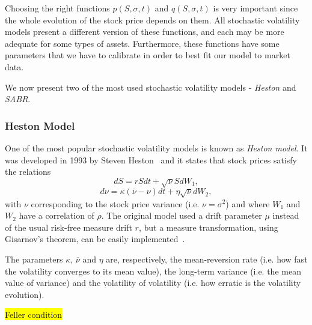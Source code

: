 Choosing the right functions $p(S,\sigma,t)$ and $q(S,\sigma,t)$ is very important since the whole evolution of the stock price depends on them. All stochastic volatility models present a different version of these functions, and each may be more adequate for some types of assets. Furthermore, these functions have some parameters that we have to calibrate in order to best fit our model to market data.

We now present two of the most used stochastic volatility models - \emph{Heston} and \emph{SABR}.



\subsubsection{Heston Model}
One of the most popular stochastic volatility models is known as \emph{Heston model}. It was developed in 1993 by Steven Heston~\cite{Heston} and it states that stock prices satisfy the relations
\begin{equation}
dS=rSdt+\sqrt{\nu}SdW_1,
\end{equation}
\begin{equation}
d\nu=\kappa(\overline{\nu}-\nu)dt+\eta\sqrt{\nu}dW_2,
\end{equation}
\noindent with $\nu$ corresponding to the stock price variance (i.e. $\nu=\sigma^2$) and where $W_1$ and $W_2$ have a correlation of $\rho$. The original model used a drift parameter $\mu$ instead of the usual risk-free measure drift $r$, but a measure transformation, using Gisarnov's theorem, can be easily implemented~\cite{Crisostomo}.

The parameters $\kappa$, $\overline{\nu}$ and $\eta$ are, respectively, the mean-reversion rate (i.e. how fast the volatility converges to its mean value), the long-term variance (i.e. the mean value of variance) and the volatility of volatility (i.e. how erratic is the volatility evolution).

\hl{Feller condition}

